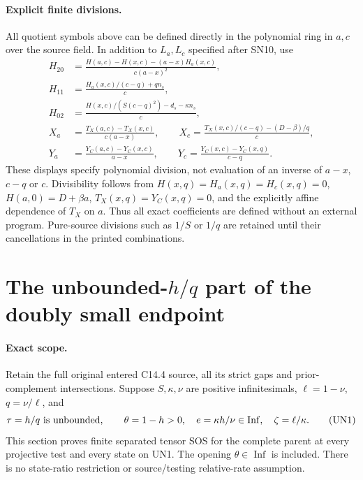 \paragraph{Explicit finite divisions.}
All quotient symbols above can be defined directly in the polynomial
ring in $a,c$ over the source field.  In addition to $L_a,L_c$
specified after SN10, use
\[
\begin{aligned}
 H_{20}&=\frac{H(a,c)-H(x,c)-(a-x)H_a(x,c)}{c(a-x)^2},\\
 H_{11}&=\frac{H_a(x,c)/(c-q)+qn_s}{c},\\
 H_{02}&=\frac{H(x,c)/(S(c-q)^2)-d_s-\kappa n_s}{c},\\
 X_a&=\frac{T_X(a,c)-T_X(x,c)}{c(a-x)},\qquad
 X_c=\frac{T_X(x,c)/(c-q)-(D-\beta)/q}{c},\\
 Y_a&=\frac{Y_C(a,c)-Y_C(x,c)}{a-x},\qquad
 Y_c=\frac{Y_C(x,c)-Y_C(x,q)}{c-q}.
\end{aligned}
\]
These displays specify polynomial division, not evaluation of an
inverse of $a-x$, $c-q$ or $c$.  Divisibility follows from
$H(x,q)=H_a(x,q)=H_c(x,q)=0$, $H(a,0)=D+\beta a$,
$T_X(x,q)=Y_C(x,q)=0$, and the explicitly affine dependence of
$T_X$ on $a$.  Thus all exact coefficients are defined without an
external program.  Pure-source divisions such as $1/S$ or $1/q$
are retained until their cancellations in the printed combinations.


\section{\texorpdfstring{The unbounded-$h/q$ part of the doubly small endpoint}{The unbounded-h/q part of the doubly small endpoint}}
\label{component:peaa56c1a3c7a}

\label{peaa56c1a3c7a:sec:new-c144-unbounded-h-ratio}

\paragraph{Exact scope.}
Retain the full original entered C14.4 source, all its strict gaps and
prior-complement intersections. Suppose $S,\kappa,\nu$ are positive
infinitesimals, $\ell=1-\nu$, $q=\nu/\ell$, and
\[
 \tau=h/q\ \hbox{is unbounded},\qquad
 \theta=1-h>0,\quad e=\kappa h/\nu\in\operatorname{Inf},\quad
 \zeta=\ell/\kappa.
 \tag{UN1}
\]
This section proves finite separated tensor SOS for the complete
parent at every projective test and every state on UN1. The opening
$\theta\in\operatorname{Inf}$ is included. There is no state-ratio
restriction or source/testing relative-rate assumption.


